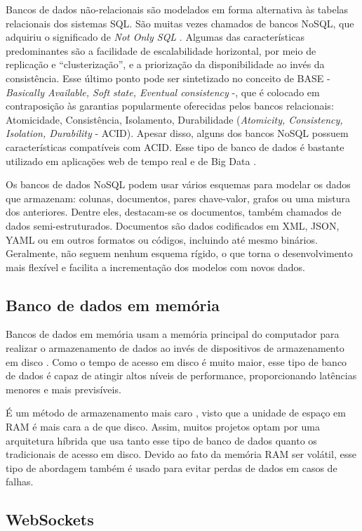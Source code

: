 Bancos de dados não-relacionais são modelados em forma alternativa às tabelas relacionais dos sistemas SQL. São muitas vezes chamados de bancos NoSQL, que adquiriu o significado de \emph{Not Only SQL} \cite{nosql}. Algumas das características predominantes são a facilidade de escalabilidade horizontal, por meio de replicação e “clusterização”, e a priorização da disponibilidade ao invés da consistência. Esse último ponto pode ser sintetizado no conceito de BASE - \emph{Basically Available, Soft state, Eventual consistency} -, que é colocado em contraposição às garantias popularmente oferecidas pelos bancos relacionais: Atomicidade, Consistência, Isolamento, Durabilidade (\emph{Atomicity, Consistency, Isolation, Durability} - ACID). Apesar disso, alguns dos bancos NoSQL possuem características compatíveis com ACID. Esse tipo de banco de dados é bastante utilizado em aplicações web de tempo real e de Big Data \cite{pereira}.

Os bancos de dados NoSQL podem usar vários esquemas para modelar os dados que armazenam: colunas, documentos, pares chave-valor, grafos ou uma mistura dos anteriores. Dentre eles, destacam-se os documentos, também chamados de dados semi-estruturados. Documentos são dados codificados em XML, JSON, YAML ou em outros formatos ou códigos, incluindo até mesmo binários. Geralmente, não seguem nenhum esquema rígido, o que torna o desenvolvimento mais flexível e facilita a incrementação dos modelos com novos dados.

\subsection{Banco de dados em memória}

Bancos de dados em memória usam a memória principal do computador para realizar o armazenamento de dados ao invés de dispositivos de armazenamento em disco \cite{raima}. Como o tempo de acesso em disco é muito maior, esse tipo de banco de dados é capaz de atingir altos níveis de performance, proporcionando latências menores e mais previsíveis.

É um método de armazenamento mais caro \cite{mullins}, visto que a unidade de espaço em RAM é mais cara a de que disco. Assim, muitos projetos optam por uma arquitetura híbrida que usa tanto esse tipo de banco de dados quanto os tradicionais de acesso em disco. Devido ao fato da memória RAM ser volátil, esse tipo de abordagem também é usado para evitar perdas de dados em casos de falhas.

\subsection{WebSockets}

